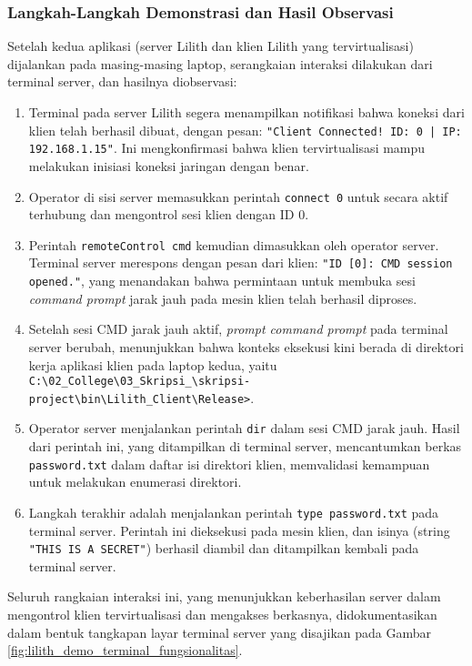 \subsubsection{Langkah-Langkah Demonstrasi dan Hasil Observasi}
Setelah kedua aplikasi (server Lilith dan klien Lilith yang tervirtualisasi) dijalankan pada masing-masing laptop, serangkaian interaksi dilakukan dari terminal server, dan hasilnya diobservasi:
\begin{enumerate}
    \item {} Terminal pada server Lilith segera menampilkan notifikasi bahwa koneksi dari klien telah berhasil dibuat, dengan pesan: \texttt{"Client Connected! ID: 0 | IP: 192.168.1.15"}. Ini mengkonfirmasi bahwa klien tervirtualisasi mampu melakukan inisiasi koneksi jaringan dengan benar.
    \item {} Operator di sisi server memasukkan perintah \texttt{connect 0} untuk secara aktif terhubung dan mengontrol sesi klien dengan ID 0.
    \item {} Perintah \texttt{remoteControl cmd} kemudian dimasukkan oleh operator server. Terminal server merespons dengan pesan dari klien: \texttt{"ID [0]: CMD session opened."}, yang menandakan bahwa permintaan untuk membuka sesi \textit{command prompt} jarak jauh pada mesin klien telah berhasil diproses.
    \item {} Setelah sesi CMD jarak jauh aktif, \textit{prompt command prompt} pada terminal server berubah, menunjukkan bahwa konteks eksekusi kini berada di direktori kerja aplikasi klien pada laptop kedua, yaitu \texttt{C:\textbackslash{}02\_College\textbackslash{}03\_Skripsi\_\textbackslash{}skripsi-project\textbackslash{}bin\textbackslash{}Lilith\_Client\textbackslash{}Release>}.
    \item {} Operator server menjalankan perintah \texttt{dir} dalam sesi CMD jarak jauh. Hasil dari perintah ini, yang ditampilkan di terminal server, mencantumkan berkas \texttt{password.txt} dalam daftar isi direktori klien, memvalidasi kemampuan untuk melakukan enumerasi direktori.
    \item {} Langkah terakhir adalah menjalankan perintah \texttt{type password.txt} pada terminal server. Perintah ini dieksekusi pada mesin klien, dan isinya (string \texttt{"THIS IS A SECRET"}) berhasil diambil dan ditampilkan kembali pada terminal server.
\end{enumerate}
Seluruh rangkaian interaksi ini, yang menunjukkan keberhasilan server dalam mengontrol klien tervirtualisasi dan mengakses berkasnya, didokumentasikan dalam bentuk tangkapan layar terminal server yang disajikan pada Gambar \ref{fig:lilith_demo_terminal_fungsionalitas}.

